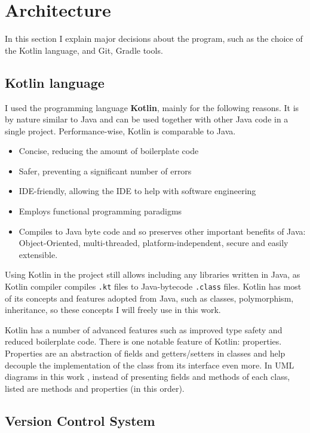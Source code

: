 \section{Architecture}

In this section I explain major decisions about the program, such as the choice of the Kotlin language, and Git, Gradle tools.

\subsection{Kotlin language}

I used the programming language \textbf{Kotlin}, mainly for the following reasons.
It is by nature similar to Java and can be used together with other Java code in a single project.
Performance-wise, Kotlin is comparable to Java.
\begin{itemize}
    \item Concise, reducing the amount of boilerplate code
    \item Safer, preventing a significant number of errors
    \item IDE-friendly, allowing the IDE to help with software engineering
    \item Employs functional programming paradigms\cite{Bonev}
    \item Compiles to Java byte code and so preserves other important benefits of Java: Object-Oriented, multi-threaded, platform-independent, secure and easily extensible.
\end{itemize}

Using Kotlin in the project still allows including any libraries written in Java, as Kotlin compiler compiles \texttt{.kt} files to Java-bytecode \texttt{.class} files.
Kotlin has most of its concepts and features adopted from Java, such as classes, polymorphism, inheritance, so these concepts I will freely use in this work.

Kotlin has a number of advanced features such as improved type safety and reduced boilerplate code\cite{JemerovKotlinAction2017}.
There is one notable feature of Kotlin: properties.
Properties are an abstraction of fields and getters/setters in classes and help decouple the implementation of the class from its interface even more.
In UML diagrams in this work , instead of presenting fields and methods of each class, listed are methods and properties (in this order).


\subsection{Version Control System}


